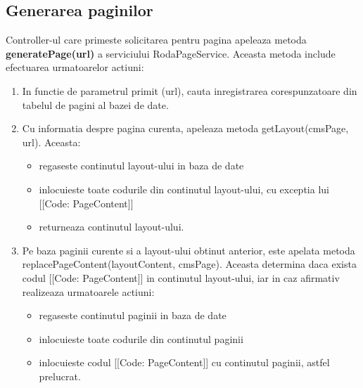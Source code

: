 \subsection{Generarea paginilor}

Controller-ul care primeste solicitarea pentru pagina apeleaza metoda \textbf{generatePage(url)} a serviciului RodaPageService. Aceasta metoda include efectuarea urmatoarelor actiuni:

\begin{enumerate}
\item{In functie de parametrul primit (url), cauta inregistrarea corespunzatoare din tabelul de pagini al bazei de date.}
\item{Cu informatia despre pagina curenta, apeleaza metoda getLayout(cmsPage, url). Aceasta:}
\begin{itemize}
\item{regaseste continutul layout-ului in baza de date}
\item{inlocuieste toate codurile din continutul layout-ului, cu exceptia lui [[Code: PageContent]]}
\item{returneaza continutul layout-ului.}
\end {itemize}
\item{Pe baza paginii curente si a layout-ului obtinut anterior, este apelata metoda replacePageContent(layoutContent, cmsPage). Aceasta determina daca exista codul [[Code: PageContent]] in continutul layout-ului, iar in caz afirmativ realizeaza urmatoarele actiuni:}
\begin{itemize}
\item {regaseste continutul paginii in baza de date}
\item{inlocuieste toate codurile din continutul paginii}
\item {inlocuieste codul [[Code: PageContent]] cu continutul paginii, astfel prelucrat.}
\end{itemize}
\end{enumerate}

\bigskip

